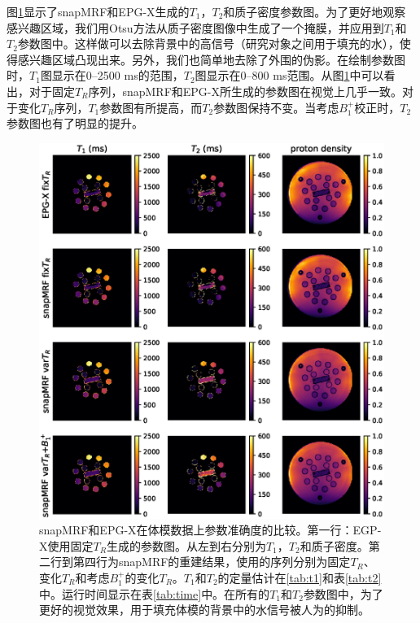 图\ref{fig:phantom}显示了snapMRF和EPG-X生成的$T_1$，$T_2$和质子密度参数图。为了更好地观察感兴趣区域，我们用Otsu方法从质子密度图像中生成了一个掩膜，并应用到$T_1$和$T_2$参数图中。这样做可以去除背景中的高信号（研究对象之间用于填充的水），使得感兴趣区域凸现出来。另外，我们也简单地去除了外围的伪影。在绘制参数图时，$T_1$图显示在0--2500 ms的范围，$T_2$图显示在0--800 ms范围。从图\ref{fig:phantom}中可以看出，对于固定$T_R$序列，snapMRF和EPG-X所生成的参数图在视觉上几乎一致。对于变化$T_R$序列，$T_1$参数图有所提高，而$T_2$参数图保持不变。当考虑$B_1^+$校正时，$T_2$参数图也有了明显的提升。

\begin{figure}[htbp]
\centerline{\includegraphics[width=1\textwidth]{img/snapmrf/figure2.eps}}
\caption{snapMRF和EPG-X在体模数据上参数准确度的比较。第一行：EGP-X使用固定$T_R$生成的参数图。从左到右分别为$T_1$，$T_2$和质子密度。第二行到第四行为snapMRF的重建结果，使用的序列分别为固定$T_R$、变化$T_R$和考虑$B_1^+$的变化$T_R$。$T_1$和$T_2$的定量估计在\ref{tab:t1}和表\ref{tab:t2}中。运行时间显示在表\ref{tab:time}中。在所有的$T_1$和$T_2$参数图中，为了更好的视觉效果，用于填充体模的背景中的水信号被人为的抑制。
}
\label{fig:phantom}
\end{figure}

